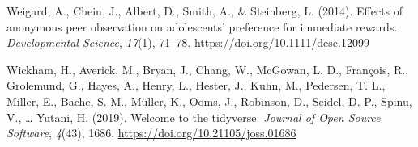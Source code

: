 \documentclass[
  pub,floatsintext]{apa6}
\newlength{\cslhangindent}
\newlength{\cslentryspacingunit} %
\newenvironment{CSLReferences}[2] %
 {%
  \setlength{\parindent}{0pt}
  \ifodd #1
  \let\oldpar\par
  \def\par{\hangindent=\cslhangindent\oldpar}
  \fi
  \setlength{\parskip}{#2\cslentryspacingunit}
 }%
 {}
\begin{document}
\begin{CSLReferences}{1}{0}
\leavevmode{}%
Weigard, A., Chein, J., Albert, D., Smith, A., \& Steinberg, L. (2014). Effects of anonymous peer observation on adolescents' preference for immediate rewards. \emph{Developmental Science}, \emph{17}(1), 71--78. \url{https://doi.org/10.1111/desc.12099}

\leavevmode{}%
Wickham, H., Averick, M., Bryan, J., Chang, W., McGowan, L. D., François, R., Grolemund, G., Hayes, A., Henry, L., Hester, J., Kuhn, M., Pedersen, T. L., Miller, E., Bache, S. M., Müller, K., Ooms, J., Robinson, D., Seidel, D. P., Spinu, V., \ldots{} Yutani, H. (2019). Welcome to the {tidyverse}. \emph{Journal of Open Source Software}, \emph{4}(43), 1686. \url{https://doi.org/10.21105/joss.01686}

\end{CSLReferences}
\end{document}
